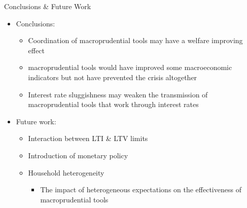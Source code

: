 \documentclass[8pt,aspectratio=169]{beamer}
\numberwithin{equation}{section}
\begin{document}
\begin{frame}{Conclusions \& Future Work}


\begin{itemize}
\item Conclusions:
\vspace{3 mm}
\begin{itemize}
\item Coordination of macroprudential tools may have a welfare improving effect
\vspace{3 mm}
\item macroprudential tools would have improved some macroeconomic indicators but not have prevented the crisis altogether
\vspace{3 mm}
\item Interest rate sluggishness may weaken the transmission of macroprudential tools that work through interest rates
\end{itemize}

\vspace{5 mm}
\item Future work: 
\vspace{3 mm}
\begin{itemize}
\item Interaction between LTI \& LTV limits
\vspace{3 mm}
\item Introduction of monetary policy 
\vspace{3 mm}
\item Household heterogeneity 

\begin{itemize}
\item The impact of heterogeneous expectations on the effectiveness of macroprudential tools
\end{itemize}
\end{itemize}

\end{itemize}
\end{frame}
\end{document}
